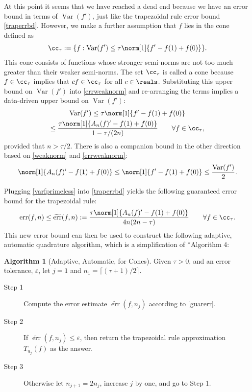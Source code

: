 \documentclass[]{article}
\DeclareMathOperator{\Var}{Var}
\DeclareMathOperator{\err}{err}
\newcommand{\terr}{\widetilde{\err}}
\theoremstyle{definition}
\newtheorem{algo}{Algorithm}
\theoremstyle{remark}
\begin{document}
At this point it seems that we have reached a dead end because we have an error bound in terms of $\Var(f')$, just like the trapezoidal rule error bound \eqref{traperrbd}.  However, we make a further assumption that $f$ lies in the cone defined as 
\begin{equation} \label{conedef}
\cc_{\tau} := \{f : \Var(f') \le \tau \norm[1]{f'-f(1)+f(0)} \}.
\end{equation}
This cone consists of functions whose stronger semi-norms are not too much greater than their weaker semi-norms.  The set $\cc_{\tau}$ is called a cone because $f \in \cc_{\tau}$ implies that $cf \in \cc_{\tau}$ for all $c \in \reals$.  Substituting this upper bound on $\Var(f')$ into \eqref{errweaknorm} and re-arranging the terms implies a data-driven upper bound on  $\Var(f')$:
\begin{multline} \label{varfprimeless}
\Var(f') \le \tau \norm[1]{f'-f(1)+f(0)}  \\
\le \frac{\tau \norm[1]{A_n(f)'-f(1)+f(0)}}{1-\tau/(2n)} \qquad \forall f \in \cc_{\tau},
\end{multline}
provided that $n>\tau/2$.  There is also a companion bound in the other direction based on \eqref{weaknorm} and \eqref{errweaknorm}:
\begin{equation} \label{varfprimegreat}
\norm[1]{A_n(f)'-f(1)+f(0)} \le \norm[1]{f'-f(1)+f(0)} \le \frac{\Var(f')}{2}.
\end{equation}

Plugging \eqref{varfprimeless} into \eqref{traperrbd} yields the following guaranteed error bound for the trapezoidal rule:
\begin{equation} \label{guarerr}
\err(f,n) \le \terr(f,n) := \frac{\tau \norm[1]{A_n(f)'-f(1)+f(0)}} {4n(2n-\tau)} \qquad \forall f \in \cc_{\tau}.
\end{equation}
This new error bound can then be used to construct the following adaptive, automatic quadrature algorithm, which is a simplification of *{Algorithm 4}:

\begin{algo}[Adaptive, Automatic, for Cones] \label{conealgo} Given $\tau>0$, and an error tolerance, $\varepsilon$, let $j=1$ and $n_1=\lceil (\tau+1)/2 \rceil$.

\begin{description} 

\item[Step 1] Compute the error estimate $\terr(f,n_j)$ according to \eqref{guarerr}.

\item [Step 2] If $\terr(f,n_j) \le \varepsilon$, then return the trapezoidal rule approximation $T_{n_j}(f)$ as the answer.  

\item [Step 3] Otherwise let $n_{j+1}=2 n_j$, increase $j$ by one, and go to Step 1.

\end{description}
\end{algo}
\end{document}
